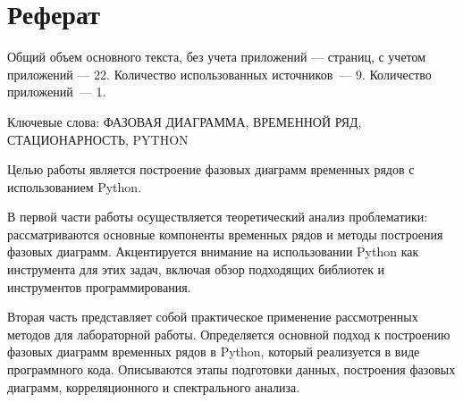 \chapter*{Реферат}
\thispagestyle{plain}

Общий объем основного текста, без учета приложений ---
\pageref{end_of_main_text} страниц, с учетом приложений ---
22. Количество использованных источников~--- 9.
Количество приложений~--- 1.

Ключевые слова: ФАЗОВАЯ ДИАГРАММА, ВРЕМЕННОЙ РЯД, СТАЦИОНАРНОСТЬ, PYTHON

Целью работы является построение фазовых диаграмм временных рядов с использованием Python.

В первой части работы осуществляется теоретический анализ проблематики: рассматриваются основные компоненты
временных рядов и методы построения фазовых диаграмм. Акцентируется внимание на использовании Python
как инструмента для этих задач, включая обзор подходящих библиотек и инструментов программирования.

Вторая часть представляет собой практическое применение рассмотренных методов для лабораторной работы. Определяется основной подход к построению
фазовых диаграмм временных рядов в Python, который реализуется в виде программного кода. Описываются этапы
подготовки данных, построения фазовых диаграмм, корреляционного и спектрального анализа.
